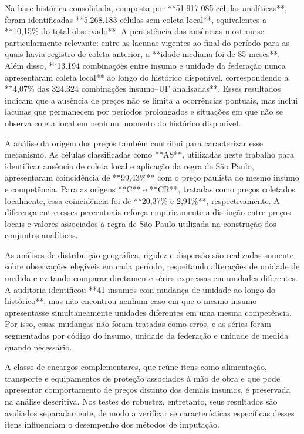 Na base histórica consolidada, composta por **51.917.085 células analíticas**, 
foram identificadas **5.268.183 células sem coleta local**, equivalentes a **10,15\% 
do total observado**. A persistência das ausências mostrou-se particularmente relevante: 
entre as lacunas vigentes ao final do período para as quais havia registro de coleta 
anterior, a **idade mediana foi de 85 meses**. Além disso, **13.194 combinações entre 
insumo e unidade da federação nunca apresentaram coleta local** ao longo do histórico 
disponível, correspondendo a **4,07\% das 324.324 combinações insumo--UF analisadas**. 
Esses resultados indicam que a ausência de preços não se limita a ocorrências pontuais, 
mas inclui lacunas que permanecem por períodos prolongados e situações em que não se 
observa coleta local em nenhum momento do histórico disponível.

A análise da origem dos preços também contribui para caracterizar esse mecanismo. 
As células classificadas como **AS**, utilizadas neste trabalho para identificar 
ausência de coleta local e aplicação da regra de São Paulo, apresentaram coincidência 
de **99,43\%** com o preço paulista do mesmo insumo e competência. Para as origens **C** 
e **CR**, tratadas como preços coletados localmente, essa coincidência foi de **20,37\% 
e 2,91\%**, respectivamente. A diferença entre esses percentuais reforça empiricamente a 
distinção entre preços locais e valores associados à regra de São Paulo utilizada na 
construção dos conjuntos analíticos.

As análises de distribuição geográfica, rigidez e dispersão são realizadas somente 
sobre observações elegíveis em cada período, respeitando alterações de unidade de medida 
e evitando comparar diretamente séries expressas em unidades diferentes. A auditoria 
identificou **41 insumos com mudança de unidade ao longo do histórico**, mas não 
encontrou nenhum caso em que o mesmo insumo apresentasse simultaneamente unidades 
diferentes em uma mesma competência. Por isso, essas mudanças não foram tratadas como 
erros, e as séries foram segmentadas por código do insumo, unidade da federação e 
unidade de medida quando necessário.

A classe de encargos complementares, que reúne itens como alimentação, transporte e 
equipamentos de proteção associados à mão de obra e que pode apresentar comportamento de 
preços distinto dos demais insumos, é preservada na análise descritiva. Nos testes de 
robustez, entretanto, seus resultados são avaliados separadamente, de modo a verificar 
se características específicas desses itens influenciam o desempenho dos métodos de 
imputação.

